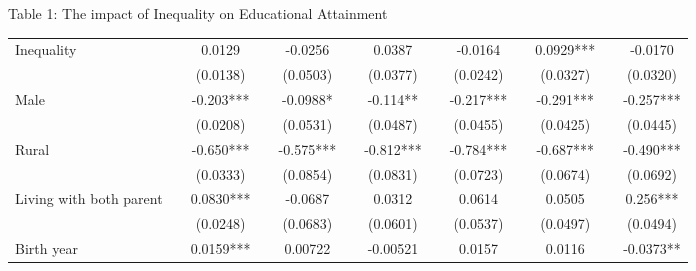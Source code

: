 \documentclass{beamer}
\begin{document}
\begin{frame}[label=main6]{\scriptsize Table 1: The impact of Inequality on Educational Attainment \hyperlink{Robustness}{\beamerbutton {\textcolor{red}{Robustness Checks}}}}
\begin{table}[htbp]
\begin{adjustbox}{max width=\textwidth}
\begin{tabular}{lllllllllllll}
    Inequality &       & \multicolumn{1}{c}{0.0129} &       & \multicolumn{1}{c}{-0.0256} &       & \multicolumn{1}{c}{0.0387} &       & \multicolumn{1}{c}{-0.0164} &       & \multicolumn{1}{c}{0.0929***} &       & \multicolumn{1}{c}{-0.0170} \\
          &       & \multicolumn{1}{c}{(0.0138)} &       & \multicolumn{1}{c}{(0.0503)} &       & \multicolumn{1}{c}{(0.0377)} &       & \multicolumn{1}{c}{(0.0242)} &       & \multicolumn{1}{c}{(0.0327)} &       & \multicolumn{1}{c}{(0.0320)} \\
    Male  &       & \multicolumn{1}{c}{-0.203***} &       & \multicolumn{1}{c}{-0.0988*} &       & \multicolumn{1}{c}{-0.114**} &       & \multicolumn{1}{c}{-0.217***} &       & \multicolumn{1}{c}{-0.291***} &       & \multicolumn{1}{c}{-0.257***} \\
          &       & \multicolumn{1}{c}{(0.0208)} &       & \multicolumn{1}{c}{(0.0531)} &       & \multicolumn{1}{c}{(0.0487)} &       & \multicolumn{1}{c}{(0.0455)} &       & \multicolumn{1}{c}{(0.0425)} &       & \multicolumn{1}{c}{(0.0445)} \\
    Rural &       & \multicolumn{1}{c}{-0.650***} &       & \multicolumn{1}{c}{-0.575***} &       & \multicolumn{1}{c}{-0.812***} &       & \multicolumn{1}{c}{-0.784***} &       & \multicolumn{1}{c}{-0.687***} &       & \multicolumn{1}{c}{-0.490***} \\
          &       & \multicolumn{1}{c}{(0.0333)} &       & \multicolumn{1}{c}{(0.0854)} &       & \multicolumn{1}{c}{(0.0831)} &       & \multicolumn{1}{c}{(0.0723)} &       & \multicolumn{1}{c}{(0.0674)} &       & \multicolumn{1}{c}{(0.0692)} \\
    Living with both parent &       & \multicolumn{1}{c}{0.0830***} &       & \multicolumn{1}{c}{-0.0687} &       & \multicolumn{1}{c}{0.0312} &       & \multicolumn{1}{c}{0.0614} &       & \multicolumn{1}{c}{0.0505} &       & \multicolumn{1}{c}{0.256***} \\
          &       & \multicolumn{1}{c}{(0.0248)} &       & \multicolumn{1}{c}{(0.0683)} &       & \multicolumn{1}{c}{(0.0601)} &       & \multicolumn{1}{c}{(0.0537)} &       & \multicolumn{1}{c}{(0.0497)} &       & \multicolumn{1}{c}{(0.0494)} \\
    Birth year &       & \multicolumn{1}{c}{0.0159***} &       & \multicolumn{1}{c}{0.00722} &       & \multicolumn{1}{c}{-0.00521} &       & \multicolumn{1}{c}{0.0157} &       & \multicolumn{1}{c}{0.0116} &       & \multicolumn{1}{c}{-0.0373**} \\

\end{tabular}
\end{adjustbox}
\end{table}
\end{frame}
\end{document}
